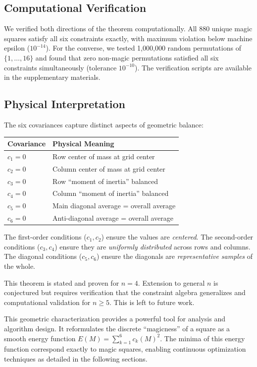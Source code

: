 \subsection{Computational Verification}

We verified both directions of the theorem computationally. All 880 unique magic squares satisfy all six constraints exactly, with maximum violation below machine epsilon ($10^{-14}$). For the converse, we tested 1,000,000 random permutations of $\{1, \ldots, 16\}$ and found that zero non-magic permutations satisfied all six constraints simultaneously (tolerance $10^{-10}$). The verification scripts are available in the supplementary materials.

\subsection{Physical Interpretation}

The six covariances capture distinct aspects of geometric balance:

\begin{center}
\begin{tabular}{ll}
\toprule
\textbf{Covariance} & \textbf{Physical Meaning} \\
\midrule
$c_1 = 0$ & Row center of mass at grid center \\
$c_2 = 0$ & Column center of mass at grid center \\
$c_3 = 0$ & Row ``moment of inertia'' balanced \\
$c_4 = 0$ & Column ``moment of inertia'' balanced \\
$c_5 = 0$ & Main diagonal average = overall average \\
$c_6 = 0$ & Anti-diagonal average = overall average \\
\bottomrule
\end{tabular}
\end{center}

The first-order conditions ($c_1, c_2$) ensure the values are \textit{centered}. The second-order conditions ($c_3, c_4$) ensure they are \textit{uniformly distributed} across rows and columns. The diagonal conditions ($c_5, c_6$) ensure the diagonals are \textit{representative samples} of the whole.

\begin{remark}[Scope]
This theorem is stated and proven for $n = 4$. Extension to general $n$ is conjectured but requires verification that the constraint algebra generalizes and computational validation for $n \geq 5$. This is left to future work.
\end{remark}

This geometric characterization provides a powerful tool for analysis and algorithm design. It reformulates the discrete ``magicness'' of a square as a smooth energy function $E(M) = \sum_{k=1}^{6} c_k(M)^2$. The minima of this energy function correspond exactly to magic squares, enabling continuous optimization techniques as detailed in the following sections.
